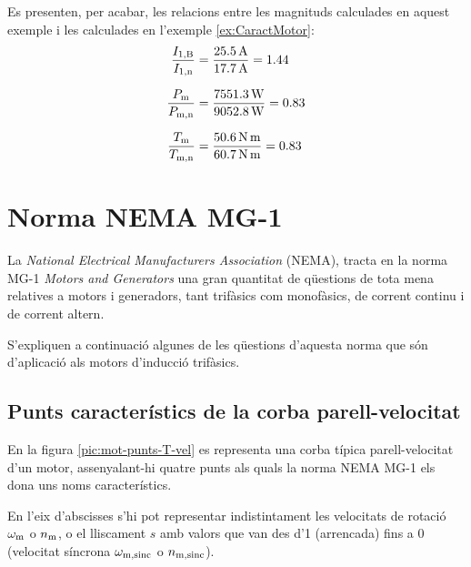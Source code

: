 \begin{exemple}
	Es presenten, per acabar, les relacions entre les magnituds calculades en aquest exemple i les calculades en l'exemple \ref{ex:CaractMotor}:
	\begin{align*}
		\frac{I_\mathrm{1,B}}{I_\mathrm{1,n}} &=  \frac{\qty{25,5}{A}}{\qty{17,7}{A}}= \num{1,44} \\[1.5ex]
		\frac{P_\mathrm{m}}{P_\mathrm{m,n}} &= \frac{\qty{7551,3}{W}}{\qty{9052,8}{W}} = \num{0,83} \\[1.5ex]
		\frac{T_\mathrm{m}}{T_\mathrm{m,n}} &=  \frac{\qty{50,6}{N.m}}{\qty{60,7}{N.m}} = \num{0,83}
	\end{align*}
	
\end{exemple}	    
	    
\section{Norma NEMA MG-1}

La \textit{National Electrical Manufacturers Association} (NEMA),
tracta en la norma  MG-1 \textit{Motors and Generators} una gran quantitat de qüestions de tota mena relatives a motors i generadors, tant trifàsics com monofàsics, de corrent continu i de corrent altern.

S'expliquen a continuació algunes de les qüestions d'aquesta norma que són d'aplicació als motors d'inducció trifàsics.

\subsection{Punts característics de la corba parell-velocitat}

En la figura \vref{pic:mot-punts-T-vel} es representa una corba típica parell-velocitat d'un motor, assenyalant-hi quatre punts als quals la norma NEMA MG-1 els dona uns noms característics. 

En l'eix d'abscisses s'hi pot representar indistintament les velocitats de rotació $\omega_\mathrm{m}$ o $n_\mathrm{m}$, o  el lliscament $s$ amb valors que van des d'1 (arrencada) fins a 0 (velocitat síncrona $\omega_\mathrm{m,sinc}$ o $n_\mathrm{m,sinc}$).

\begin{center}
	
	\label{pic:mot-punts-T-vel}
\end{center}

